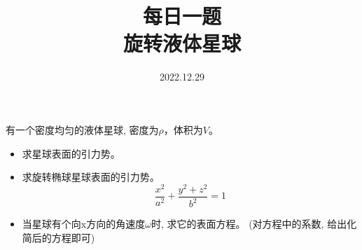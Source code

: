 \documentclass {ctexart}
\title {每日一题\\{\small 旋转液体星球}}
\date{2022.12.29}
\begin{document}
    \maketitle {}

    有一个密度均匀的液体星球, 密度为\(\rho\)，体积为\(V\)。
    \begin{itemize}
        \item 求星球表面的引力势。
        \item 求旋转椭球星球表面的引力势。
            \begin{equation}
                \frac{x^2}{a^2}+\frac{y^2+z^2}{b^2}=1
            \end{equation}
        \item 当星球有个向x方向的角速度\(\omega\)时, 求它的表面方程。
            (对方程中的系数, 给出化简后的方程即可)
    \end{itemize}
\end{document}
